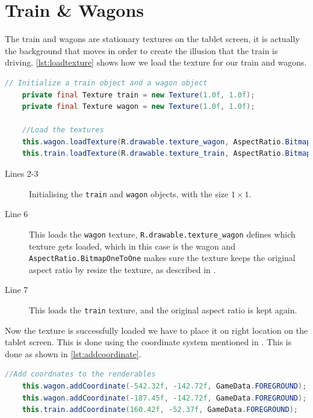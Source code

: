 \section{Train \& Wagons}
The train and wagons are stationary textures on the tablet screen, it is actually the background that moves in order to create the illusion that the train is driving. \autoref{lst:loadtexture} shows how we load the texture for our train and wagons.

\begin{lstlisting}[language=java,firstnumber=1,caption={Loading the texture for our train and wagons.},label=lst:loadtexture] 
	// Initialize a train object and a wagon object
	private final Texture train = new Texture(1.0f, 1.0f);
	private final Texture wagon = new Texture(1.0f, 1.0f);

	//Load the textures
	this.wagon.loadTexture(R.drawable.texture_wagon, AspectRatio.BitmapOneToOne);
	this.train.loadTexture(R.drawable.texture_train, AspectRatio.BitmapOneToOne); 
\end{lstlisting}

\begin{description}
\item[Lines 2-3] Initialising the \lstinline|train| and \lstinline|wagon| objects, with the size $1 \times 1$.
\item[Line 6] This loads the \lstinline|wagon| texture, \lstinline|R.drawable.texture_wagon| defines which texture gets loaded, which in this case is the wagon and \lstinline|AspectRatio.BitmapOneToOne| makes sure the texture keeps the original aspect ratio by resize the texture, as described in .
\item[Line 7] This loads the \lstinline|train| texture, and the original aspect ratio is kept again.
\end{description}

Now the texture is successfully loaded we have to place it on right location on the tablet screen. This is done using the coordinate system mentioned in . This is done as shown in \autoref{lst:addcoordinate}.

\begin{lstlisting}[language=java,firstnumber=1,caption={Placing the texture on the screen.},label=lst:addcoordinate] 
	//Add coordnates to the renderables
	this.wagon.addCoordinate(-542.32f, -142.72f, GameData.FOREGROUND);
	this.wagon.addCoordinate(-187.45f, -142.72f, GameData.FOREGROUND);
	this.train.addCoordinate(160.42f, -52.37f, GameData.FOREGROUND);
\end{lstlisting}


